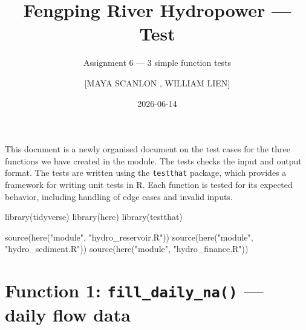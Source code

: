 \documentclass[
  11pt,
  letterpaper,
  DIV=11,
  numbers=noendperiod]{scrartcl}
\title{Fengping River Hydropower --- Test}
\subtitle{Assignment 6 --- 3 simple function tests}
\author{{[}MAYA SCANLON , WILLIAM LIEN{]}}
\date{2026-06-14}
\newenvironment{Shaded}{\begin{snugshade}}{\end{snugshade}}
\newcommand{\FunctionTok}[1]{\textcolor[rgb]{0.28,0.35,0.67}{#1}}
\newcommand{\NormalTok}[1]{\textcolor[rgb]{0.00,0.23,0.31}{#1}}
\newcommand{\StringTok}[1]{\textcolor[rgb]{0.13,0.47,0.30}{#1}}
\renewcommand*\contentsname{Table of contents}
\newcommand\contentsname{Table of contents}
\begin{document}
\maketitle

\renewcommand*\contentsname{Table of contents}
{
\hypersetup{linkcolor=}
\setcounter{tocdepth}{2}
\tableofcontents
}

This document is a newly organised document on the test cases for the
three functions we have created in the module. The tests checks the
input and output format. The tests are written using the
\texttt{testthat} package, which provides a framework for writing unit
tests in R. Each function is tested for its expected behavior, including
handling of edge cases and invalid inputs.

\begin{Shaded}
\begin{Highlighting}[]
\FunctionTok{library}\NormalTok{(tidyverse)}
\FunctionTok{library}\NormalTok{(here)}
\FunctionTok{library}\NormalTok{(testthat)}

\FunctionTok{source}\NormalTok{(}\FunctionTok{here}\NormalTok{(}\StringTok{"module"}\NormalTok{, }\StringTok{"hydro\_reservoir.R"}\NormalTok{))}
\FunctionTok{source}\NormalTok{(}\FunctionTok{here}\NormalTok{(}\StringTok{"module"}\NormalTok{, }\StringTok{"hydro\_sediment.R"}\NormalTok{))}
\FunctionTok{source}\NormalTok{(}\FunctionTok{here}\NormalTok{(}\StringTok{"module"}\NormalTok{, }\StringTok{"hydro\_finance.R"}\NormalTok{))}
\end{Highlighting}
\end{Shaded}

\section{\texorpdfstring{Function 1: \texttt{fill\_daily\_na()} ---
daily flow
data}{Function 1: fill\_daily\_na() --- daily flow data}}\label{function-1-fill_daily_na-daily-flow-data}
\end{document}
